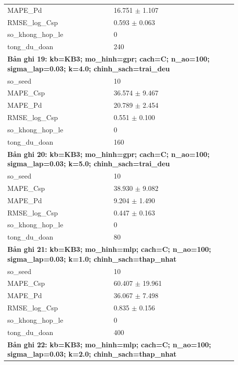 \begin{longtable}{p{0.43\linewidth}p{0.50\linewidth}}
MAPE\_\allowbreak Pd & 16.751 $\pm$ 1.107 \\
RMSE\_\allowbreak log\_\allowbreak Csp & 0.593 $\pm$ 0.063 \\
so\_\allowbreak khong\_\allowbreak hop\_\allowbreak le & 0 \\
tong\_\allowbreak du\_\allowbreak doan & 240 \\
\midrule
\multicolumn{2}{p{0.95\linewidth}}{\textbf{Bản ghi 19: kb=KB3; mo\_hinh=gpr; cach=C; n\_ao=100; sigma\_lap=0.03; k=4.0; chinh\_sach=trai\_deu}} \\
so\_\allowbreak seed & 10 \\
MAPE\_\allowbreak Csp & 36.574 $\pm$ 9.467 \\
MAPE\_\allowbreak Pd & 20.789 $\pm$ 2.454 \\
RMSE\_\allowbreak log\_\allowbreak Csp & 0.551 $\pm$ 0.100 \\
so\_\allowbreak khong\_\allowbreak hop\_\allowbreak le & 0 \\
tong\_\allowbreak du\_\allowbreak doan & 160 \\
\midrule
\multicolumn{2}{p{0.95\linewidth}}{\textbf{Bản ghi 20: kb=KB3; mo\_hinh=gpr; cach=C; n\_ao=100; sigma\_lap=0.03; k=5.0; chinh\_sach=trai\_deu}} \\
so\_\allowbreak seed & 10 \\
MAPE\_\allowbreak Csp & 38.930 $\pm$ 9.082 \\
MAPE\_\allowbreak Pd & 9.204 $\pm$ 1.490 \\
RMSE\_\allowbreak log\_\allowbreak Csp & 0.447 $\pm$ 0.163 \\
so\_\allowbreak khong\_\allowbreak hop\_\allowbreak le & 0 \\
tong\_\allowbreak du\_\allowbreak doan & 80 \\
\midrule
\multicolumn{2}{p{0.95\linewidth}}{\textbf{Bản ghi 21: kb=KB3; mo\_hinh=mlp; cach=C; n\_ao=100; sigma\_lap=0.03; k=1.0; chinh\_sach=thap\_nhat}} \\
so\_\allowbreak seed & 10 \\
MAPE\_\allowbreak Csp & 60.407 $\pm$ 19.961 \\
MAPE\_\allowbreak Pd & 36.067 $\pm$ 7.498 \\
RMSE\_\allowbreak log\_\allowbreak Csp & 0.835 $\pm$ 0.156 \\
so\_\allowbreak khong\_\allowbreak hop\_\allowbreak le & 0 \\
tong\_\allowbreak du\_\allowbreak doan & 400 \\
\midrule
\multicolumn{2}{p{0.95\linewidth}}{\textbf{Bản ghi 22: kb=KB3; mo\_hinh=mlp; cach=C; n\_ao=100; sigma\_lap=0.03; k=2.0; chinh\_sach=thap\_nhat}} \\

\end{longtable}
